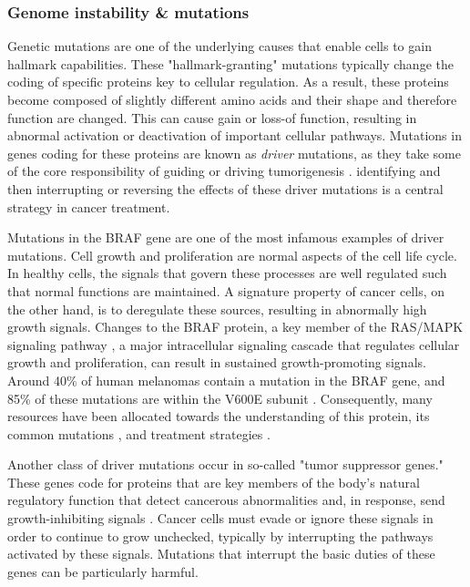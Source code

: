 \subsubsection{Genome instability \& mutations}
Genetic mutations are one of the underlying causes that enable cells to gain hallmark capabilities.
These "hallmark-granting" mutations typically change the coding of specific proteins key to cellular regulation.
As a result, these proteins become composed of slightly different amino acids and their shape and therefore function are changed.
This can cause gain or loss-of function, resulting in abnormal activation or deactivation of important cellular pathways.
Mutations in genes coding for these proteins are known as \emph{driver} mutations, as they take some of the core responsibility of guiding or driving tumorigenesis \cite{martinez-jimenez2020}.
identifying and then interrupting or reversing the effects of these driver mutations is a central strategy in cancer treatment.

Mutations in the BRAF gene are one of the most infamous examples of driver mutations.
Cell growth and proliferation are normal aspects of the cell life cycle.
In healthy cells, the signals that govern these processes are well regulated such that normal functions are maintained.
A signature property of cancer cells, on the other hand, is to deregulate these sources, resulting in abnormally high growth signals.
Changes to the BRAF protein, a key member of the RAS/MAPK signaling pathway \cite{davies2011}, a major intracellular signaling cascade that regulates cellular growth and proliferation,
can result in sustained growth-promoting signals.
Around 40\% of human melanomas contain a mutation in the BRAF gene, and 
85\% of these mutations are within the V600E subunit \cite{spathis2019}.
Consequently, many resources have been allocated towards the understanding of this protein, its common mutations \cite{smiech2020}, and treatment strategies \cite{cheng2018}.

Another class of driver mutations occur in so-called "tumor suppressor genes."
These genes code for proteins that are key members of the body's natural regulatory function that detect cancerous abnormalities and, in response, send growth-inhibiting signals \cite{joyce2024}.
Cancer cells must evade or ignore these signals in order to continue to grow unchecked,
typically by interrupting the pathways activated by these signals.
Mutations that interrupt the basic duties of these genes can be particularly harmful.

